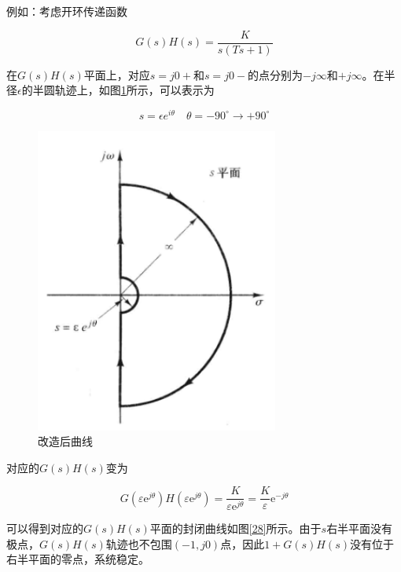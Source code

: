 例如：考虑开环传递函数

\begin{equation*}
    G(s)H(s)=\frac{K}{s(Ts+1)}
\end{equation*}

在$G(s)H(s)$平面上，对应$s=j0+$和$s=j0-$的点分别为$-j\infty$和$+j\infty$。在半径$\epsilon$的半圆轨迹上，如图\ref{27}所示，可以表示为

\begin{equation*}
    s=\epsilon e^{i\theta}\quad \theta=-90^\circ\rightarrow+90^\circ
\end{equation*}

\begin{figure}[!ht]
    \centering
    \includegraphics[width=8cm]{figures/27.png}
    \caption{改造后曲线}
    \label{27}
\end{figure}

对应的$G(s)H(s)$变为

\begin{equation*}
    G\left(\varepsilon \mathrm{e}^{j \theta}\right) H\left(\varepsilon \mathrm{e}^{j \theta}\right)=\frac{K}{\varepsilon \mathrm{e}^{j \theta}}=\frac{K}{\varepsilon} \mathrm{e}^{-j \theta}
\end{equation*}

可以得到对应的$G(s)H(s)$平面的封闭曲线如图\ref{28}所示。由于$s$右半平面没有极点，$G(s)H(s)$轨迹也不包围$(-1,j0)$点，因此$1+G(s)H(s)$没有位于右半平面的零点，系统稳定。

